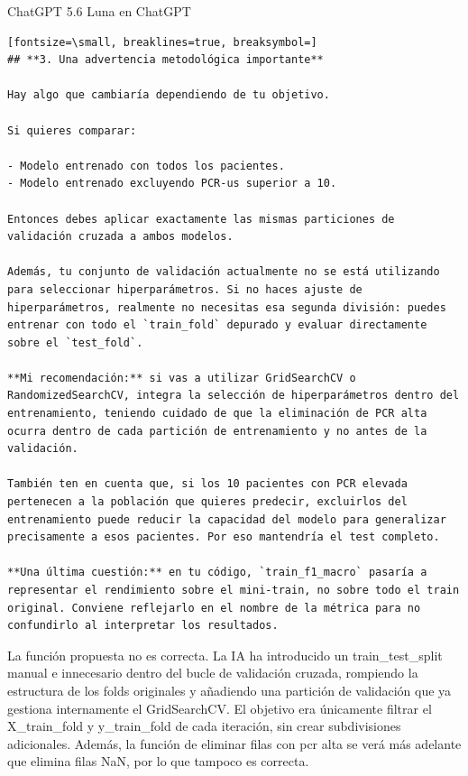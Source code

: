 \documentclass[12pt,a4paper,oneside]{book}
\begin{document}
\begin{iaresp}{ChatGPT 5.6 Luna en ChatGPT}
\begin{Verbatim}[fontsize=\small, breaklines=true, breaksymbol=]
## **3. Una advertencia metodológica importante**

Hay algo que cambiaría dependiendo de tu objetivo.

Si quieres comparar:

- Modelo entrenado con todos los pacientes.
- Modelo entrenado excluyendo PCR-us superior a 10.

Entonces debes aplicar exactamente las mismas particiones de validación cruzada a ambos modelos.

Además, tu conjunto de validación actualmente no se está utilizando para seleccionar hiperparámetros. Si no haces ajuste de hiperparámetros, realmente no necesitas esa segunda división: puedes entrenar con todo el `train_fold` depurado y evaluar directamente sobre el `test_fold`.

**Mi recomendación:** si vas a utilizar GridSearchCV o RandomizedSearchCV, integra la selección de hiperparámetros dentro del entrenamiento, teniendo cuidado de que la eliminación de PCR alta ocurra dentro de cada partición de entrenamiento y no antes de la validación.

También ten en cuenta que, si los 10 pacientes con PCR elevada pertenecen a la población que quieres predecir, excluirlos del entrenamiento puede reducir la capacidad del modelo para generalizar precisamente a esos pacientes. Por eso mantendría el test completo.

**Una última cuestión:** en tu código, `train_f1_macro` pasaría a representar el rendimiento sobre el mini-train, no sobre todo el train original. Conviene reflejarlo en el nombre de la métrica para no confundirlo al interpretar los resultados.
\end{Verbatim}
\end{iaresp}
\begin{iaanalisis}
La función propuesta no es correcta. La IA ha introducido un train\_test\_split manual e innecesario dentro del bucle de validación cruzada, rompiendo la estructura de los folds originales y añadiendo una partición de validación que ya gestiona internamente el GridSearchCV. El objetivo era únicamente filtrar el X\_train\_fold y y\_train\_fold de cada iteración, sin crear subdivisiones adicionales. Además, la función de eliminar filas con pcr alta se verá más adelante que elimina filas NaN, por lo que tampoco es correcta.
\end{iaanalisis}
\end{document}
